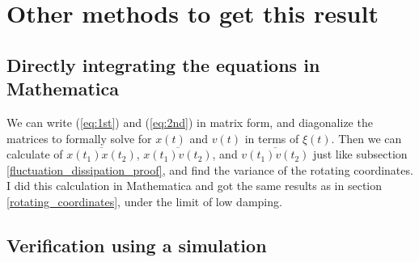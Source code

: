 \documentclass[12pt, twoside]{article}
\begin{document}
\section{Other methods to get this result}
\subsection{Directly integrating the equations in Mathematica}
We can write (\ref{eq:1st}) and (\ref{eq:2nd}) in matrix form, and diagonalize the matrices to formally solve for $x(t)$ and $v(t)$ in terms of $\xi(t)$. Then we can calculate of $\overline{x(t_1)x(t_2)}$, $\overline{x(t_1)v(t_2)}$, and  $\overline{v(t_1)v(t_2)}$ just like subsection \ref{fluctuation_dissipation_proof}, and find the variance of the rotating coordinates. I did this calculation in Mathematica and got the same results as in section \ref{rotating_coordinates}, under the limit of low damping.

\subsection{Verification using a simulation}
\end{document}
